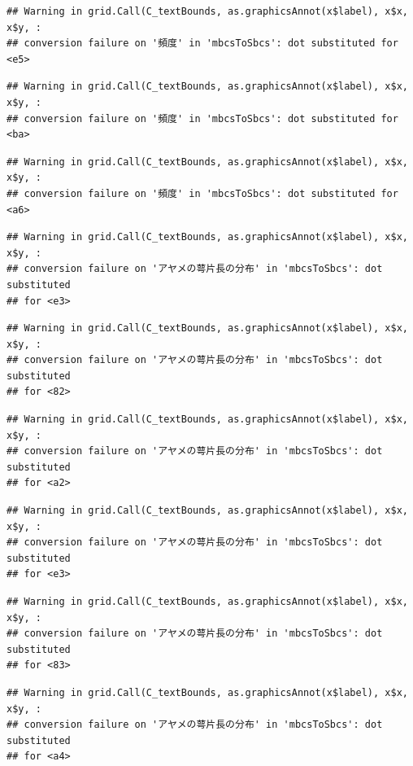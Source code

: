 \documentclass[
]{book}
\begin{document}
\begin{verbatim}
## Warning in grid.Call(C_textBounds, as.graphicsAnnot(x$label), x$x, x$y, :
## conversion failure on '頻度' in 'mbcsToSbcs': dot substituted for <e5>
\end{verbatim}

\begin{verbatim}
## Warning in grid.Call(C_textBounds, as.graphicsAnnot(x$label), x$x, x$y, :
## conversion failure on '頻度' in 'mbcsToSbcs': dot substituted for <ba>
\end{verbatim}

\begin{verbatim}
## Warning in grid.Call(C_textBounds, as.graphicsAnnot(x$label), x$x, x$y, :
## conversion failure on '頻度' in 'mbcsToSbcs': dot substituted for <a6>
\end{verbatim}

\begin{verbatim}
## Warning in grid.Call(C_textBounds, as.graphicsAnnot(x$label), x$x, x$y, :
## conversion failure on 'アヤメの萼片長の分布' in 'mbcsToSbcs': dot substituted
## for <e3>
\end{verbatim}

\begin{verbatim}
## Warning in grid.Call(C_textBounds, as.graphicsAnnot(x$label), x$x, x$y, :
## conversion failure on 'アヤメの萼片長の分布' in 'mbcsToSbcs': dot substituted
## for <82>
\end{verbatim}

\begin{verbatim}
## Warning in grid.Call(C_textBounds, as.graphicsAnnot(x$label), x$x, x$y, :
## conversion failure on 'アヤメの萼片長の分布' in 'mbcsToSbcs': dot substituted
## for <a2>
\end{verbatim}

\begin{verbatim}
## Warning in grid.Call(C_textBounds, as.graphicsAnnot(x$label), x$x, x$y, :
## conversion failure on 'アヤメの萼片長の分布' in 'mbcsToSbcs': dot substituted
## for <e3>
\end{verbatim}

\begin{verbatim}
## Warning in grid.Call(C_textBounds, as.graphicsAnnot(x$label), x$x, x$y, :
## conversion failure on 'アヤメの萼片長の分布' in 'mbcsToSbcs': dot substituted
## for <83>
\end{verbatim}

\begin{verbatim}
## Warning in grid.Call(C_textBounds, as.graphicsAnnot(x$label), x$x, x$y, :
## conversion failure on 'アヤメの萼片長の分布' in 'mbcsToSbcs': dot substituted
## for <a4>
\end{verbatim}
\end{document}
